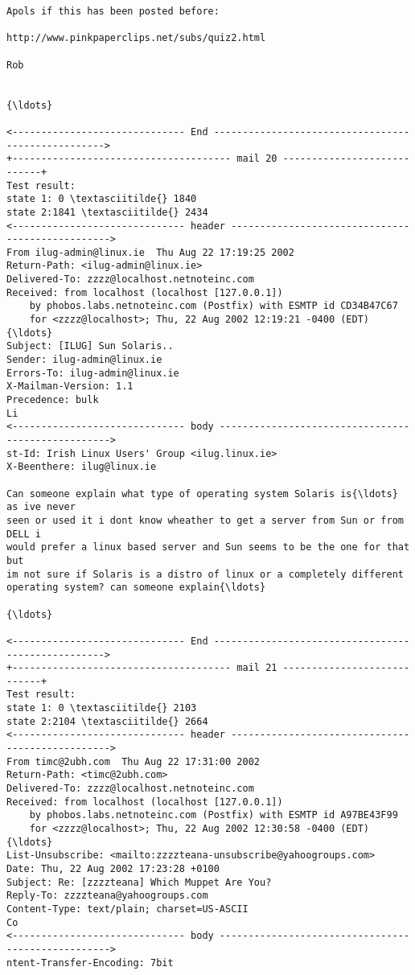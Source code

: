 \documentclass[11pt]{article}
\begin{document}
\begin{Verbatim}[commandchars=\\\{\}]
Apols if this has been posted before:

http://www.pinkpaperclips.net/subs/quiz2.html

Rob


{\ldots}

<------------------------------ End --------------------------------------------------->
+-------------------------------------- mail 20 ----------------------------+
Test result:
state 1: 0 \textasciitilde{} 1840
state 2:1841 \textasciitilde{} 2434
<------------------------------ header ------------------------------------------------->
From ilug-admin@linux.ie  Thu Aug 22 17:19:25 2002
Return-Path: <ilug-admin@linux.ie>
Delivered-To: zzzz@localhost.netnoteinc.com
Received: from localhost (localhost [127.0.0.1])
	by phobos.labs.netnoteinc.com (Postfix) with ESMTP id CD34B47C67
	for <zzzz@localhost>; Thu, 22 Aug 2002 12:19:21 -0400 (EDT)
{\ldots}
Subject: [ILUG] Sun Solaris..
Sender: ilug-admin@linux.ie
Errors-To: ilug-admin@linux.ie
X-Mailman-Version: 1.1
Precedence: bulk
Li
<------------------------------ body --------------------------------------------------->
st-Id: Irish Linux Users' Group <ilug.linux.ie>
X-Beenthere: ilug@linux.ie

Can someone explain what type of operating system Solaris is{\ldots} as ive never
seen or used it i dont know wheather to get a server from Sun or from DELL i
would prefer a linux based server and Sun seems to be the one for that but
im not sure if Solaris is a distro of linux or a completely different
operating system? can someone explain{\ldots}

{\ldots}

<------------------------------ End --------------------------------------------------->
+-------------------------------------- mail 21 ----------------------------+
Test result:
state 1: 0 \textasciitilde{} 2103
state 2:2104 \textasciitilde{} 2664
<------------------------------ header ------------------------------------------------->
From timc@2ubh.com  Thu Aug 22 17:31:00 2002
Return-Path: <timc@2ubh.com>
Delivered-To: zzzz@localhost.netnoteinc.com
Received: from localhost (localhost [127.0.0.1])
	by phobos.labs.netnoteinc.com (Postfix) with ESMTP id A97BE43F99
	for <zzzz@localhost>; Thu, 22 Aug 2002 12:30:58 -0400 (EDT)
{\ldots}
List-Unsubscribe: <mailto:zzzzteana-unsubscribe@yahoogroups.com>
Date: Thu, 22 Aug 2002 17:23:28 +0100
Subject: Re: [zzzzteana] Which Muppet Are You?
Reply-To: zzzzteana@yahoogroups.com
Content-Type: text/plain; charset=US-ASCII
Co
<------------------------------ body --------------------------------------------------->
ntent-Transfer-Encoding: 7bit


\end{Verbatim}
\end{document}
